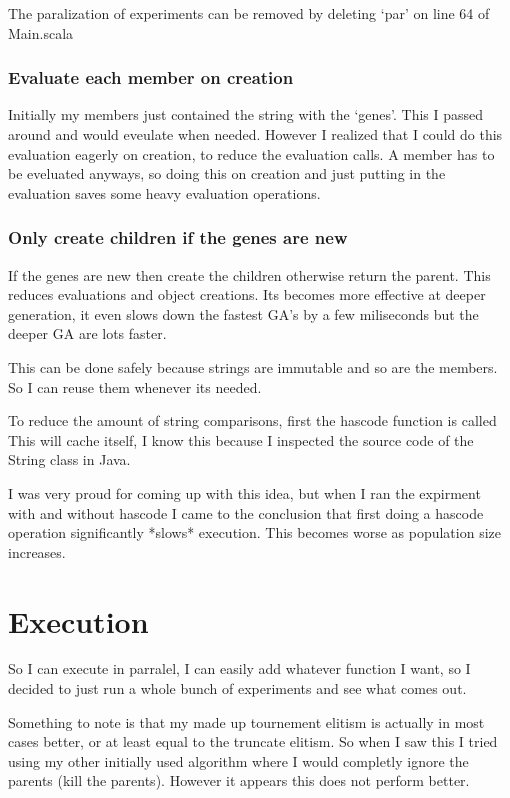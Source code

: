 \documentclass{article}
\begin{document}
\begin{empfile}
The paralization of experiments can be removed by deleting `par' on line 64
of Main.scala

\subsubsection{Evaluate each member on creation}
Initially my members just contained the string with the `genes'. This I passed
around and would eveulate when needed. However I realized that I could do this
evaluation eagerly on creation, to reduce the evaluation calls. A member has
to be eveluated anyways, so doing this on creation and just putting in the
evaluation saves some heavy evaluation operations.

\subsubsection{Only create children if the genes are new}
If the genes are new then create the children otherwise return the parent.
This reduces evaluations and object creations. Its becomes more effective
at deeper generation, it even slows down the fastest GA's by a few miliseconds
but the deeper GA are lots faster.

This can be done safely because strings are immutable and so are the members.
So I can reuse them whenever its needed.

To reduce the amount of string comparisons, first the hascode function is called
This will cache itself, I know this because I inspected the source code of the
String class in Java.

I was very proud for coming up with  this idea, but when I ran the expirment with
and without hascode I came to the conclusion that first doing a hascode operation
significantly *slows* execution. This becomes worse as population size increases.

\section{Execution}
So I can execute in parralel, I can easily add whatever function I want, so
I decided to just run a whole bunch of experiments and see what comes out.

Something to note is that my made up tournement elitism is actually in most
cases better, or at least equal to the truncate elitism. So when I saw
this I tried using my other initially used algorithm where I would completly
ignore the parents (kill the parents). However it appears this does not 
perform better.


\end{empfile}
\end{document}
